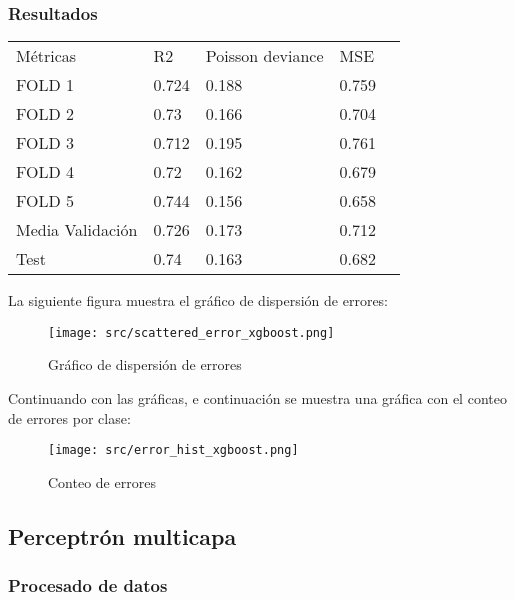 \subsubsection{Resultados}
\begin{table}[H]
	 \centering
	\begin{tabular}{|l|l|l|l|l}
		\cline{1-4}
		Métricas         &	 R2  & Poisson deviance & MSE   \\ \cline{1-4}
		FOLD 1           & 0.724 & 0.188            & 0.759 \\ \cline{1-4}
		FOLD 2           & 0.73  & 0.166            & 0.704 \\ \cline{1-4}
		FOLD 3           & 0.712 & 0.195            & 0.761 \\ \cline{1-4}
		FOLD 4           & 0.72  & 0.162            & 0.679 \\ \cline{1-4}
		FOLD 5           & 0.744 & 0.156            & 0.658 \\ \cline{1-4}
		Media Validación & 0.726 & 0.173            & 0.712 \\ \cline{1-4}
		Test             & 0.74  & 0.163            & 0.682 \\ \cline{1-4}
	\end{tabular}
\end{table}
La siguiente figura muestra el gráfico de dispersión de errores:
\begin{figure}[H]
	\centering
	\texttt{[image: src/scattered\_error\_xgboost.png]}
	\caption{Gráfico de dispersión de errores}
	\label{fig:xgboost_scattered}
\end{figure}
Continuando con las gráficas, e continuación se muestra una gráfica con el conteo de errores por clase:\\
\linebreak
\begin{figure}[H]
	\centering
	\texttt{[image: src/error\_hist\_xgboost.png]}
	\caption{Conteo de errores}
	\label{fig:xgboost_error_plot}
\end{figure}
\subsection{Perceptrón multicapa}
\subsubsection{Procesado de datos}
